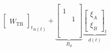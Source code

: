 \begin{equation}
{\begin{bmatrix}
    \\W_{\text{TB}}\end{bmatrix}_{t}}_{u(t)} +
\underbrace{
\begin{bmatrix}
 & \\
1 & \\
 &1 \\
 & \\
 & \\
 & \\
 &\\
 & \end{bmatrix}
}_{B_d}\underbrace{\begin{bmatrix}\xi_{A}\\\xi_{B}\end{bmatrix}_{t}}_{d(t)} 
\end{equation}

